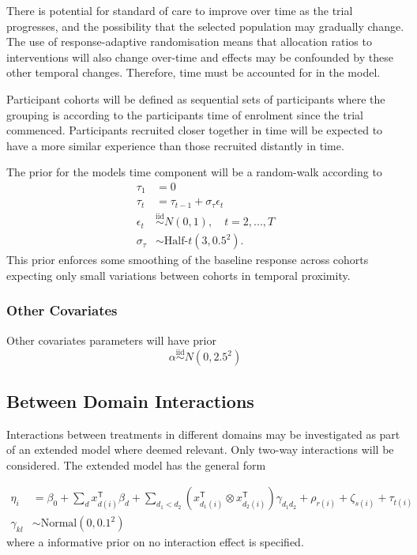 \documentclass[
  11pt,
]{article}
\begin{document}
There is potential for standard of care to improve over time as the trial progresses, and the possibility that the selected population may gradually change.
The use of response-adaptive randomisation means that allocation ratios to interventions will also change over-time and effects may be confounded by these other temporal changes.
Therefore, time must be accounted for in the model.

Participant cohorts will be defined as sequential sets of participants where the grouping is according to the participants time of enrolment since the trial commenced.
Participants recruited closer together in time will be expected to have a more similar experience than those recruited distantly in time.

The prior for the models time component will be a random-walk according to
\[
\begin{aligned}
\tau_1 &= 0 \\
\tau_t &= \tau_{t-1} + \sigma_\tau\epsilon_t \\
\epsilon_t &\overset{\text{iid}}{\sim} N(0, 1),\quad t=2,...,T \\
\sigma_\tau &\sim \text{Half-}t(3, 0.5^2).
\end{aligned}
\]
This prior enforces some smoothing of the baseline response across cohorts expecting only small variations between cohorts in temporal proximity.

\hypertarget{other-covariates}{%
\subsubsection{Other Covariates}\label{other-covariates}}

Other covariates parameters will have prior
\[
\alpha \overset{\text{iid}}{\sim} N(0, 2.5^2)
\]

\hypertarget{between-domain-interactions}{%
\subsection{Between Domain Interactions}\label{between-domain-interactions}}

Interactions between treatments in different domains may be investigated as part of an extended model where deemed relevant.
Only two-way interactions will be considered.
The extended model has the general form

\[
\begin{aligned}
\eta_i &= \beta_0 + \sum_{d} x_{d(i)}^{\mathsf{T}}\beta_d + 
\sum_{d_1<d_2}\left(x_{d_1(i)}^{\mathsf{T}}\otimes x_{d_2(i)}^{\mathsf{T}}\right)\gamma_{d_1d_2} + 
\rho_{r(i)} + \zeta_{s(i)} + \tau_{t(i)} \\
\gamma_{kl} &\sim \text{Normal}(0, 0.1^2)
\end{aligned}
\]
where a informative prior on no interaction effect is specified.
\end{document}
